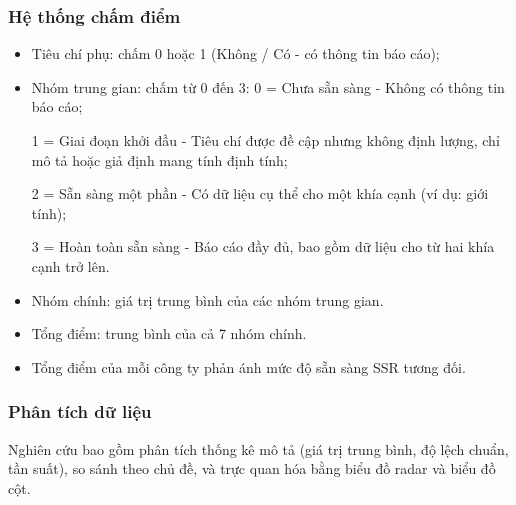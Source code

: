 \subsubsection{Hệ thống chấm điểm}
\begin{itemize}
\item Tiêu chí phụ: chấm 0 hoặc 1 (Không / Có - có thông tin báo cáo);
\item Nhóm trung gian: chấm từ 0 đến 3:
    \hspace{1cm} 0 = Chưa sẵn sàng - Không có thông tin báo cáo;  
    
    \hspace{1cm} 1 = Giai đoạn khởi đầu - Tiêu chí được đề cập nhưng không định lượng, chỉ mô tả hoặc giả định mang tính định tính;  
    
    \hspace{1cm} 2 = Sẵn sàng một phần - Có dữ liệu cụ thể cho một khía cạnh (ví dụ: giới tính);  

    \hspace{1cm} 3 = Hoàn toàn sẵn sàng - Báo cáo đầy đủ, bao gồm dữ liệu cho từ hai khía cạnh trở lên.  

\item Nhóm chính: giá trị trung bình của các nhóm trung gian.  
\item Tổng điểm: trung bình của cả 7 nhóm chính.  
\item Tổng điểm của mỗi công ty phản ánh mức độ sẵn sàng SSR tương đối.  

\end{itemize}

\subsubsection{Phân tích dữ liệu}
Nghiên cứu bao gồm phân tích thống kê mô tả (giá trị trung bình, độ lệch chuẩn, tần suất), so sánh theo chủ đề, và trực quan hóa bằng biểu đồ radar và biểu đồ cột.


